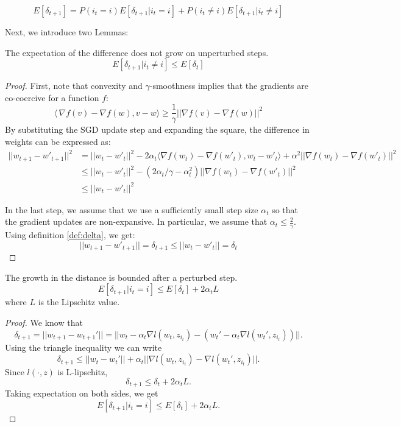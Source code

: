 \documentclass{article}
\begin{document}
\begin{equation} \label{eqn: sgd_prob_decomp}
    E[\delta_{t+1}] = P(i_t = i) E[\delta_{t+1} | i_t = i] + P(i_t \neq i) E[\delta_{t+1} | i_t \neq i]
\end{equation}

Next, we introduce two Lemmas:

\begin{lemma} \label{lem: lem_1}
The expectation of the difference does not grow on unperturbed steps.
    \[
    E[\delta_{t+1} | i_t \neq i] \leq E[\delta_t]
    \]
\end{lemma}
\begin{proof}
First, note that convexity and $\gamma$-smoothness implies that the gradients are co-coercive for a  function $f$: 
\[ 
\langle\,\nabla f(v)- \nabla f(w), v-w \rangle \geq \frac{1}{\gamma}||\nabla f(v)- \nabla f(w)||^2
\]
By substituting the SGD update step and expanding the square, the difference in weights can be expressed as:
\begin{align*}
    ||w_{t+1}-w'_{t+1}||^2 &= ||w_t-w'_t||^2 - 2\alpha_t \langle \nabla f(w_t)- \nabla f(w'_t), w_t-w'_t \rangle +\alpha^2 ||\nabla f(w_t)- \nabla f(w'_t)||^2\\
    &\leq ||w_t-w'_t||^2 - (2 \alpha_t / \gamma - \alpha_t^2) ||\nabla f(w_t)- \nabla f(w'_t)||^2\\
    &\leq ||w_t-w'_t||^2
\end{align*}

In the last step, we assume that we use a sufficiently small step size $\alpha_t$ so that the gradient updates are non-expansive. In particular, we assume that $\alpha_t \leq \frac{2}{\gamma}$.\\

Using definition \ref{def:delta}, we get:
    \[
    ||w_{t+1}-w'_{t+1}|| = \delta_{t+1} \leq ||w_{t}-w'_{t}|| = \delta_{t}
    \]
\end{proof}
\begin{lemma} \label{lem: lem_2} The growth in the distance is bounded after a perturbed step.
    \[
    E[\delta_{t+1} | i_t = i] \leq E[\delta_t] + 2 \alpha_t L
    \]
where $L$ is the Lipschitz value.
\end{lemma}
\begin{proof}
We know that 
    \[\delta_{t+1}=||w_{t+1}-w_{t+1}'||=||w_t-\alpha_t \nabla l(w_t, z_{i_t}) - ( w_t'-\alpha_t \nabla l(w_t', z_{i_t}))||.
    \]
Using the triangle inequality we can write
    \[\delta_{t+1} \leq ||w_t - w_t'|| + \alpha_t||\nabla l(w_t,z_{i_t}) - \nabla l(w_t',z_{i_t})||.
    \]
Since $l(\cdot, z)$ is L-lipschitz,
    \[\delta_{t+1} \leq \delta_t + 2\alpha_t L.
    \]
Taking expectation on both sides, we get
    \[E[\delta_{t+1}|i_t=i] \leq E[\delta_t] + 2\alpha_t L.
    \]
\end{proof}
\end{document}
